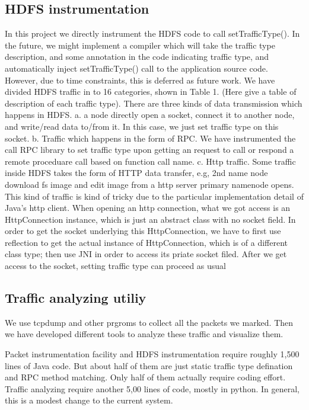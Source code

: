 \subsection{HDFS instrumentation}
     In this project we directly instrument the HDFS code to call setTrafficType(). In the future, we might implement a compiler which will take the traffic type description, and some annotation in the code indicating traffic type, and automatically inject setTrafficType() call to the application source code. However, due to time constraints, this is deferred as future work. 
       We have divided HDFS traffic in to 16 categories, shown in Table 1. (Here give a table of description of each traffic type). There are three kinds of data transmission which happens in HDFS.
     a. a node directly open a socket, connect it to another node, and write/read data to/from it. In this case, we just set traffic type on this socket. 
     b. Traffic which happens in the form of RPC. We have instrumented the call RPC library to set traffic type upon getting an request to call or respond a remote proceduare call based on function call name. 
     c. Http traffic. Some traffic inside HDFS takes the form of HTTP data transfer, e.g, 2nd name node download fs image and edit image from a http server primary namenode opens. This kind of traffic is kind of tricky due to the particular implementation detail of Java's http client. When opening an http connection, what we got access is an HttpConnection instance, which is just an abstract class with no socket field. In order to get the socket underlying this HttpConnection, we have to first use reflection to get the actual instance of HttpConnection, which is of a different class type; then use JNI in order to access its priate socket filed. After we get access to the socket, setting traffic type can proceed as usual 

\subsection{Traffic analyzing utiliy}
    We use tcpdump and other prgroms to collect all the packets we marked. Then we have developed different tools to analyze these traffic and visualize them. 

Packet instrumentation facility and HDFS instrumentation require roughly 1,500 lines of Java code. But about half of them are just static traffic type defination and RPC method matching. Only half of them actually require coding effort. Traffic analyzing require another 5,00 lines of code, mostly in python. In general, this is a modest change to the current system.

